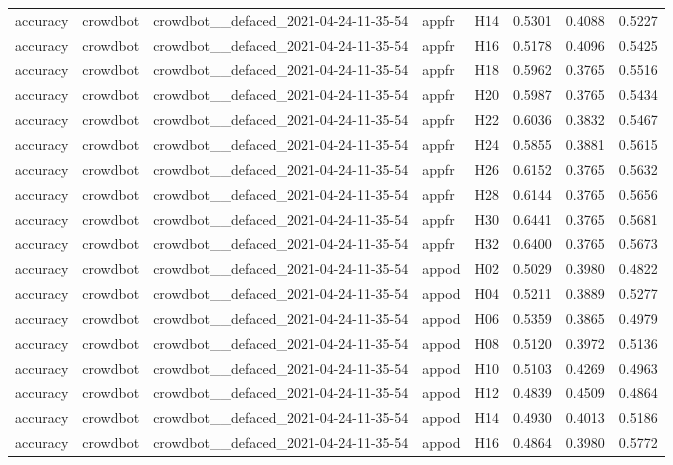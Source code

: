\begin{table}[tbp]
\begin{tabular}{lllllrrr}
accuracy & crowdbot & crowdbot\_\_defaced\_2021-04-24-11-35-54 & appfr & H14 & 0.5301 & 0.4088 & 0.5227 \\
accuracy & crowdbot & crowdbot\_\_defaced\_2021-04-24-11-35-54 & appfr & H16 & 0.5178 & 0.4096 & 0.5425 \\
accuracy & crowdbot & crowdbot\_\_defaced\_2021-04-24-11-35-54 & appfr & H18 & 0.5962 & 0.3765 & 0.5516 \\
accuracy & crowdbot & crowdbot\_\_defaced\_2021-04-24-11-35-54 & appfr & H20 & 0.5987 & 0.3765 & 0.5434 \\
accuracy & crowdbot & crowdbot\_\_defaced\_2021-04-24-11-35-54 & appfr & H22 & 0.6036 & 0.3832 & 0.5467 \\
accuracy & crowdbot & crowdbot\_\_defaced\_2021-04-24-11-35-54 & appfr & H24 & 0.5855 & 0.3881 & 0.5615 \\
accuracy & crowdbot & crowdbot\_\_defaced\_2021-04-24-11-35-54 & appfr & H26 & 0.6152 & 0.3765 & 0.5632 \\
accuracy & crowdbot & crowdbot\_\_defaced\_2021-04-24-11-35-54 & appfr & H28 & 0.6144 & 0.3765 & 0.5656 \\
accuracy & crowdbot & crowdbot\_\_defaced\_2021-04-24-11-35-54 & appfr & H30 & 0.6441 & 0.3765 & 0.5681 \\
accuracy & crowdbot & crowdbot\_\_defaced\_2021-04-24-11-35-54 & appfr & H32 & 0.6400 & 0.3765 & 0.5673 \\
accuracy & crowdbot & crowdbot\_\_defaced\_2021-04-24-11-35-54 & appod & H02 & 0.5029 & 0.3980 & 0.4822 \\
accuracy & crowdbot & crowdbot\_\_defaced\_2021-04-24-11-35-54 & appod & H04 & 0.5211 & 0.3889 & 0.5277 \\
accuracy & crowdbot & crowdbot\_\_defaced\_2021-04-24-11-35-54 & appod & H06 & 0.5359 & 0.3865 & 0.4979 \\
accuracy & crowdbot & crowdbot\_\_defaced\_2021-04-24-11-35-54 & appod & H08 & 0.5120 & 0.3972 & 0.5136 \\
accuracy & crowdbot & crowdbot\_\_defaced\_2021-04-24-11-35-54 & appod & H10 & 0.5103 & 0.4269 & 0.4963 \\
accuracy & crowdbot & crowdbot\_\_defaced\_2021-04-24-11-35-54 & appod & H12 & 0.4839 & 0.4509 & 0.4864 \\
accuracy & crowdbot & crowdbot\_\_defaced\_2021-04-24-11-35-54 & appod & H14 & 0.4930 & 0.4013 & 0.5186 \\
accuracy & crowdbot & crowdbot\_\_defaced\_2021-04-24-11-35-54 & appod & H16 & 0.4864 & 0.3980 & 0.5772 \\

\end{tabular}
\end{table}
